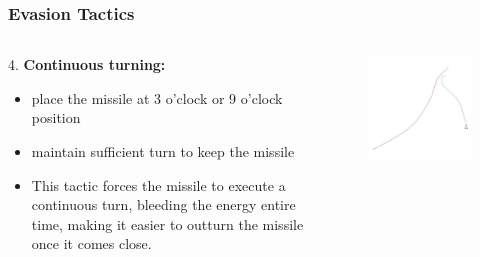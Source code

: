 \documentclass{beamer}
\begin{document}
\begin{frame}
\frametitle{Evasion Tactics}
\begin{columns}[c]
	\begin{column}{.5\linewidth}
	4. \textbf{Continuous turning:}
	\begin{itemize}
		\item place the missile at 3 o’clock or 9 o’clock position
		\item maintain sufficient turn to keep the missile 
		\item This tactic forces the missile to execute a continuous turn, bleeding the energy entire time, making it easier to outturn the missile once it comes close.
	\end{itemize}
	\end{column}

	\begin{column}{.5\linewidth}
		\begin{figure}[H]
			\centering
			\includegraphics[scale = 0.4]{fig/evasiontech4.jpg}
		\end{figure}
	\end{column}
\end{columns}
\end{frame}
\end{document}
